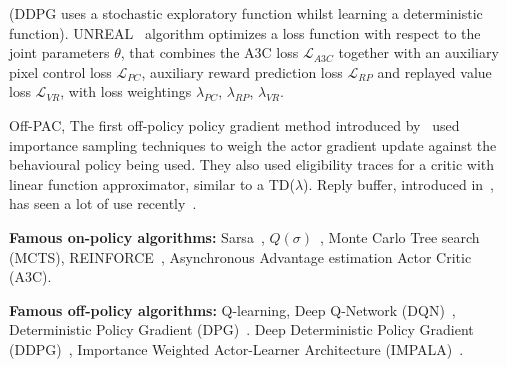 \documentclass{../main.tex}{}
\begin{document}
(DDPG uses a stochastic exploratory function whilst learning a deterministic function).
UNREAL~\citep{Jaderberg2016} algorithm optimizes a loss function with respect to the joint parameters $\theta$, that combines the A3C loss $\mathcal{L}_{A3C}$ together with an auxiliary pixel control loss $\mathcal{L}_{PC}$, auxiliary reward prediction loss $\mathcal{L}_{RP}$ and replayed value loss $\mathcal{L}_{VR}$, with loss weightings $\lambda_{PC}$, $\lambda_{RP}$, $\lambda_{VR}$.

Off-PAC, The first off-policy policy gradient method introduced by~\cite{Degris2012} used importance sampling techniques to weigh the actor gradient update against the behavioural policy being used. They also used eligibility traces for a critic with linear function approximator, similar to a TD($\lambda$). Reply buffer, introduced in~\cite{Lin1993}, has seen a lot of use recently~\citep{Mnih2013, Mnih2016}. %



\textbf{Famous on-policy algorithms:} Sarsa~\citep{Sutton1998}, $Q(\sigma)$~\citep{Deasis2017}, Monte Carlo Tree search (MCTS), REINFORCE~\citep{Williams1992}, Asynchronous Advantage estimation Actor Critic (A3C).

\textbf{Famous off-policy algorithms:} Q-learning, Deep Q-Network (DQN)~\citep{Mnih2013}, Deterministic Policy Gradient (DPG)~\citep{Silver2014}. Deep Deterministic Policy Gradient (DDPG)~\citep{Lillicrap2015}, Importance Weighted Actor-Learner Architecture (IMPALA)~\citep{Espeholt2018}.
\end{document}
